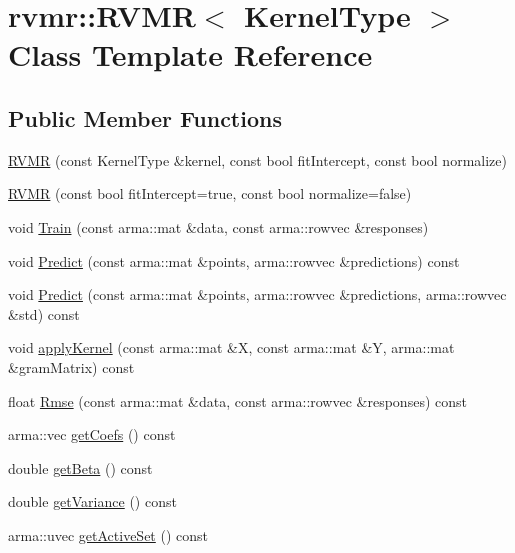 \hypertarget{classrvmr_1_1RVMR}{}\section{rvmr\+:\+:R\+V\+MR$<$ Kernel\+Type $>$ Class Template Reference}
\label{classrvmr_1_1RVMR}
\subsection*{Public Member Functions}
\begin{DoxyCompactItemize}
\item 
\hyperlink{classrvmr_1_1RVMR_a91cf7d13092d73c5e7d598557246b055}{R\+V\+MR} (const Kernel\+Type \&kernel, const bool fit\+Intercept, const bool normalize)
\item 
\hyperlink{classrvmr_1_1RVMR_ac782c43f44440583845570410f73d04c}{R\+V\+MR} (const bool fit\+Intercept=true, const bool normalize=false)
\item 
void \hyperlink{classrvmr_1_1RVMR_a7393bb3c699351170d0fed02f8450fff}{Train} (const arma\+::mat \&data, const arma\+::rowvec \&responses)
\item 
void \hyperlink{classrvmr_1_1RVMR_a5ca8b201b2b0687eac17f46f180b02bc}{Predict} (const arma\+::mat \&points, arma\+::rowvec \&predictions) const
\item 
void \hyperlink{classrvmr_1_1RVMR_ada89ff05e76b1ff88c3aa121734755bc}{Predict} (const arma\+::mat \&points, arma\+::rowvec \&predictions, arma\+::rowvec \&std) const
\item 
void \hyperlink{classrvmr_1_1RVMR_a12461ea1a5ef6d6f5ef3c00f4904338a}{apply\+Kernel} (const arma\+::mat \&X, const arma\+::mat \&Y, arma\+::mat \&gram\+Matrix) const
\item 
float \hyperlink{classrvmr_1_1RVMR_ab605fc6c920b61ca4cf5c4adf79f694b}{Rmse} (const arma\+::mat \&data, const arma\+::rowvec \&responses) const
\item 
arma\+::vec \hyperlink{classrvmr_1_1RVMR_a3e7161c98ff23a2b95aeb49267abad6d}{get\+Coefs} () const
\item 
double \hyperlink{classrvmr_1_1RVMR_a011bcaf6644cb3a092fce32f45260b11}{get\+Beta} () const
\item 
double \hyperlink{classrvmr_1_1RVMR_ad33d2446f37b22e00a05575ad5436c89}{get\+Variance} () const
\item 
arma\+::uvec \hyperlink{classrvmr_1_1RVMR_abceeb8a998a8663086c30184e45fdeca}{get\+Active\+Set} () const
\end{DoxyCompactItemize}


